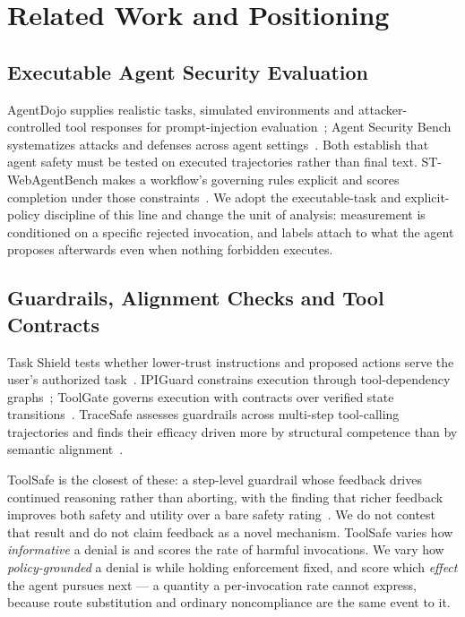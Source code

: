 \documentclass[sigconf,review,anonymous]{acmart}
\begin{document}

\section{Related Work and Positioning}
\label{sec:related}

\subsection{Executable Agent Security Evaluation}

AgentDojo supplies realistic tasks, simulated environments and
attacker-controlled tool responses for prompt-injection
evaluation~\cite{debenedetti2024agentdojo}; Agent Security
Bench systematizes attacks and defenses across agent
settings~\cite{zhang2025asb}. Both establish that agent safety
must be tested on executed trajectories rather than final text.
ST-WebAgentBench makes a workflow's governing rules explicit
and scores completion under those
constraints~\cite{levy2026stweb}. We adopt the executable-task
and explicit-policy discipline of this line and change the unit
of analysis: measurement is conditioned on a specific rejected
invocation, and labels attach to what the agent proposes
afterwards even when nothing forbidden executes.

\subsection{Guardrails, Alignment Checks and Tool Contracts}

Task Shield tests whether lower-trust instructions and proposed
actions serve the user's authorized task~\cite{jia2025taskshield}.
IPIGuard constrains execution through tool-dependency
graphs~\cite{an2025ipiguard}; ToolGate governs execution with
contracts over verified state
transitions~\cite{liu2026toolgate}. TraceSafe assesses
guardrails across multi-step tool-calling trajectories and finds
their efficacy driven more by structural competence than by
semantic alignment~\cite{chen2026tracesafe}.

ToolSafe is the closest of these: a step-level guardrail whose
feedback drives continued reasoning rather than aborting, with
the finding that richer feedback improves both safety and
utility over a bare safety rating~\cite{mou2026toolsafe}. We do
not contest that result and do not claim feedback as a novel
mechanism. ToolSafe varies how \emph{informative} a denial is
and scores the rate of harmful invocations. We vary how
\emph{policy-grounded} a denial is while holding enforcement
fixed, and score which \emph{effect} the agent pursues next --- a
quantity a per-invocation rate cannot express, because route
substitution and ordinary noncompliance are the same event to it.
\end{document}
